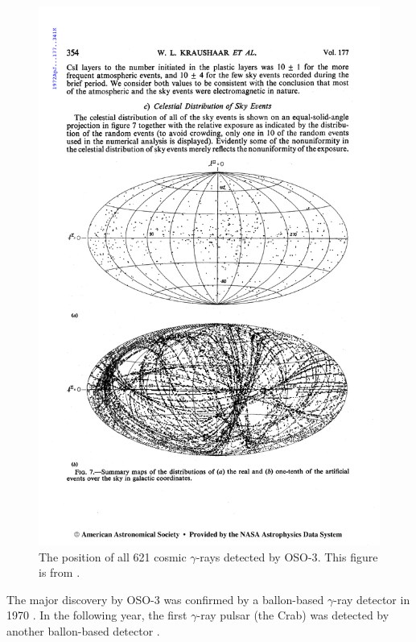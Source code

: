 \begin{figure}[htb]
\includegraphics{chapters/introduction/figures/kraushaar_et_al_1972_skymap.pdf}
\caption{The position of all 621 cosmic $\gamma$-rays
detected by \ac{OSO-3}. This figure is from 
\cite{kraushaar_1972_high-energy-cosmic}. }
\end{figure}



The major discovery by \ac{OSO-3} was confirmed by a ballon-based
$\gamma$-ray detector in 1970  \citep{kniffen_1970_study-gamma}.  In the
following year, the first $\gamma$-ray pulsar (the Crab) was detected
by another ballon-based detector \cite{browning_1971_detection-pulsed}.


